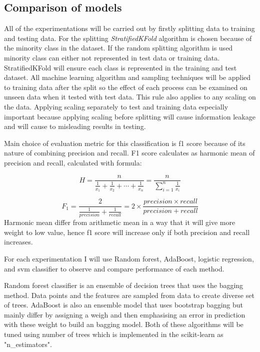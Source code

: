 \documentclass[12pt]{article}
\begin{document}
\subsection{Comparison of models} \label{subsec:comparison}

All of the experimentations will be carried out by firstly splitting data to training and testing data. For the splitting \textit{StratifiedKFold} algorithm is chosen because of the minority class in the dataset. If the random splitting algorithm is used minority class can either not represented in test data or training data. StratifiedKFold will ensure each class is represented in the training and test dataset. All machine learning algorithm and sampling techniques will be applied to training data after the split so the effect of each process can be examined on unseen data when it tested with test data. This rule also applies to any scaling on the data. Applying scaling separately to test and training data especially important because applying scaling before splitting will cause information leakage and will cause to misleading results in testing.

Main choice of evaluation metric for this classification is f1 score because of its nature of combining precision and recall. F1 score calculates as harmonic mean of precision and recall, calculated with formula:

\begin{equation*}
    H = \frac{n}{\frac{1}{x_{1}} + \frac{1}{x_{2}} + \cdots + \frac{1}{x_{n}}} = \frac{n}{\sum_{i=1}^n{\frac{1}{x_{i}}}}
\end{equation*}

\begin{equation*}
    F_{1} = \frac{2}{\frac{1}{precision} + \frac{1}{recall}} = 2 \times \frac{precision \times recall}{precision + recall}
\end{equation*}
Harmonic mean differ from arithmetic mean in a way that it will give more weight to low value, hence f1 score will increase only if both precision and recall increases.

For each experimentation I will use Random forest, AdaBoost, logistic regression, and svm classifier to observe and compare performance of each method.

Random forest classifier is an ensemble of decision trees that uses the bagging method. Data points and the features are sampled from data to create diverse set of trees. AdaBoost is also an ensemble model that uses bootstrap bagging but mainly differ by assigning a weigh and then emphasising an error in prediction with these weight to build an bagging model. Both of these algorithms will be tuned using number of trees which is implemented in the scikit-learn as "n\_estimators".
\end{document}
